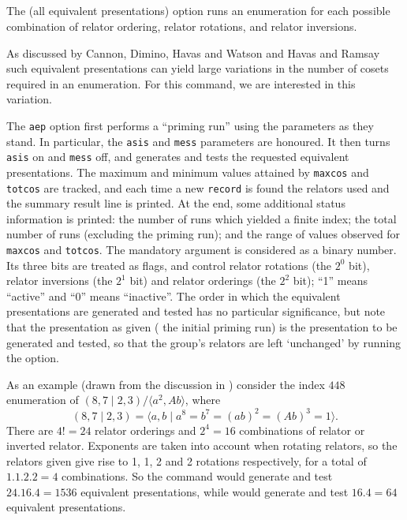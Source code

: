 \subsection{}
\label{cmd:aep}
The  (all equivalent presentations) option runs an enumeration
for each
possible combination of relator ordering, relator rotations, and relator
inversions.

As discussed by Cannon, Dimino, Havas and Watson \cite{CDHW} and Havas
  and Ramsay \cite{HR1} such equivalent presentations can yield large
  variations in the number of cosets required in an enumeration.
For this command, we are interested in this variation.

The {\tt aep} option first performs a ``priming run'' using the parameters
  as they stand.
In particular, the {\tt asis} and {\tt mess} parameters are honoured.
It then turns {\tt asis} on and {\tt mess} off, and generates and tests
  the requested equivalent presentations.
The maximum and minimum values attained by {\tt maxcos} and {\tt totcos}
  are tracked, and each time a new {\tt record} is found the relators used and
  the summary result line is printed.
At the end, some additional status information is printed: 
  the number of runs which yielded a finite index; 
  the total number of runs (excluding the priming run); 
  and the range of values observed for {\tt maxcos} and {\tt totcos}.
The mandatory argument is considered as a binary number.
Its three bits are treated as flags, and control relator rotations (the
  $2^0$ bit), relator inversions (the $2^1$ bit) and relator orderings
  (the $2^2$ bit); ``1'' means ``active'' and ``0'' means
  ``inactive''.
The order in which the equivalent presentations are generated and tested
  has no particular significance, but note that the presentation as given
  (\kern-1.5pt the initial priming run) is the 
  presentation to be generated and tested, so that the group's relators are
  left `unchanged' by running the  option.

As an example (drawn from the discussion in \cite{HR1}) consider the index
  $448$ enumeration of $(8,7 \mid 2,3) / \langle a^2,Ab \rangle$,
  where $$ (8,7 \mid 2,3) 
    = \langle a,b \mid a^8 = b^7 = (ab)^2 = (Ab)^3 = 1 \rangle . $$
There are $4!=24$ relator orderings and $2^4=16$ combinations of relator or
  inverted relator.
Exponents are taken into account when rotating relators, so the relators
  given give rise to 1, 1, 2 and 2 rotations respectively, for a total
  of $1.1.2.2=4$ combinations.
So the command  would generate and test $24.16.4=1536$ 
  equivalent presentations, while  would generate and test 
  $16.4=64$ equivalent presentations.

